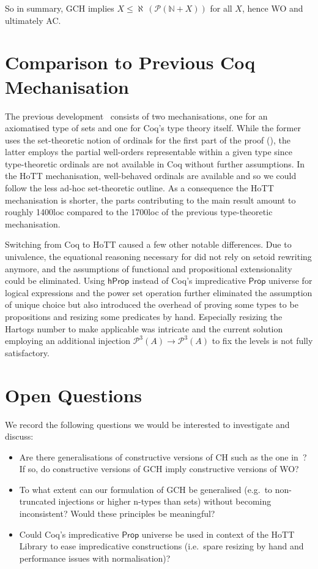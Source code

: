 \documentclass{easychair}
\newcommand{\nat}{\mathbb{N}}
\newcommand{\pow}{\mathcal{P}}
\newcommand{\hprop}{\mathsf{hProp}}
\begin{document}
So in summary, GCH implies $X\le \aleph\,(\pow(\nat + X))$ for all $X$, hence WO and ultimately AC.


\section{Comparison to Previous Coq Mechanisation}

The previous development~\cite{kirst2021generalised} consists of two mechanisations, one for an axiomatised type of sets and one for Coq's type theory itself.
While the former uses the set-theoretic notion of ordinals for the first part of the proof (), the latter employs the partial well-orders representable within a given type since type-theoretic ordinals are not available in Coq without further assumptions.
In the HoTT mechanisation, well-behaved ordinals are available and so we could follow the less ad-hoc set-theoretic outline.
As a consequence the HoTT mechanisation is shorter, the parts contributing to the main result amount to roughly 1400loc compared to the 1700loc of the previous type-theoretic mechanisation.

Switching from Coq to HoTT caused a few other notable differences.
Due to univalence, the equational reasoning necessary for  did not rely on setoid rewriting anymore, and the assumptions of functional and propositional extensionality could be eliminated.
Using $\hprop$ instead of Coq's impredicative $\mathsf{Prop}$ universe for logical expressions and the power set operation further eliminated the assumption of unique choice but also introduced the overhead of proving some types to be propositions and resizing some predicates by hand.
Especially resizing the Hartogs number to make  applicable was intricate and the current solution employing an additional injection $\pow^3(A)\to\pow^3(A)$ to fix the levels is not fully satisfactory.


\section{Open Questions}

We record the following questions we would be interested to investigate and discuss:
\begin{itemize}[noitemsep]
	\item
	Are there generalisations of constructive versions of CH such as the one in~\cite{gielen1981continuum}?
	If so, do constructive versions of GCH imply constructive versions of WO?
	\item
	To what extent can our formulation of GCH be generalised (e.g.\ to non-truncated injections or higher n-types than sets) without becoming inconsistent? Would these principles be meaningful?
	\item
	Could Coq's impredicative $\mathsf{Prop}$ universe be used in context of the HoTT Library to ease impredicative constructions (i.e.\ spare resizing by hand and performance issues with normalisation)?
\end{itemize}



\scriptsize{}
\vspace{-20em}
\end{document}
